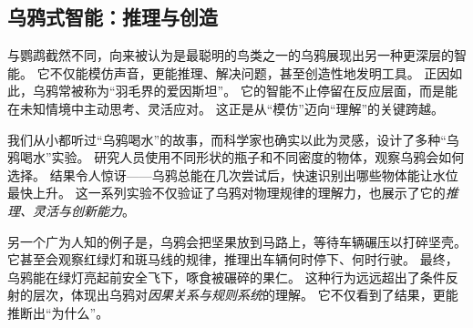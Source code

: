 \subsection{乌鸦式智能：推理与创造}

与鹦鹉截然不同，向来被认为是最聪明的鸟类之一的乌鸦展现出另一种更深层的智能。
它不仅能模仿声音，更能推理、解决问题，甚至创造性地发明工具。
正因如此，乌鸦常被称为“羽毛界的爱因斯坦”。
它的智能不止停留在反应层面，而是能在未知情境中主动思考、灵活应对。
这正是从“模仿”迈向“理解”的关键跨越。


我们从小都听过“乌鸦喝水”的故事，而科学家也确实以此为灵感，设计了多种“乌鸦喝水”实验。
研究人员使用不同形状的瓶子和不同密度的物体，观察乌鸦会如何选择。
结果令人惊讶——乌鸦总能在几次尝试后，快速识别出哪些物体能让水位最快上升。
这一系列实验不仅验证了乌鸦对物理规律的理解力，也展示了它的\emph{推理、灵活与创新能力}。


另一个广为人知的例子是，乌鸦会把坚果放到马路上，等待车辆碾压以打碎坚壳。
它甚至会观察红绿灯和斑马线的规律，推理出车辆何时停下、何时行驶。
最终，乌鸦能在绿灯亮起前安全飞下，啄食被碾碎的果仁。
这种行为远远超出了条件反射的层次，体现出乌鸦对\emph{因果关系与规则系统}的理解。
它不仅看到了结果，更能推断出“为什么”。


